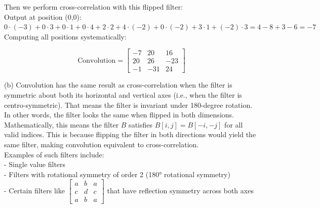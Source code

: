 Then we perform cross-correlation with this flipped filter:\\

Output at position (0,0): $0\cdot(-3) + 0\cdot3 + 0\cdot1 + 0\cdot4 + 2\cdot2 + 4\cdot(-2) + 0\cdot(-2) + 3\cdot1 + (-2)\cdot3 = 4 - 8 + 3 - 6 = -7$\\

Computing all positions systematically:

$$
\text{Convolution} = \left[\begin{array}{ccc}
-7 & 20 & 16 \\
20 & 26 & -23 \\
-1 & -31 & 24
\end{array}\right]
$$

(b) Convolution has the same result as cross-correlation when the filter is symmetric about both its horizontal and vertical axes (i.e., when the filter is centro-symmetric). That means the filter is invariant under 180-degree rotation. In other words, the filter looks the same when flipped in both dimensions.\\

Mathematically, this means the filter $B$ satisfies $B[i,j] = B[-i,-j]$ for all valid indices. This is because flipping the filter in both directions would yield the same filter, making convolution equivalent to cross-correlation.\\

Examples of such filters include:\\
- Single value filters\\
- Filters with rotational symmetry of order 2 (180° rotational symmetry)\\
- Certain filters like $\begin{bmatrix}a & b & a\\c & d & c\\a & b & a\end{bmatrix}$ that have reflection symmetry across both axes

\newpage